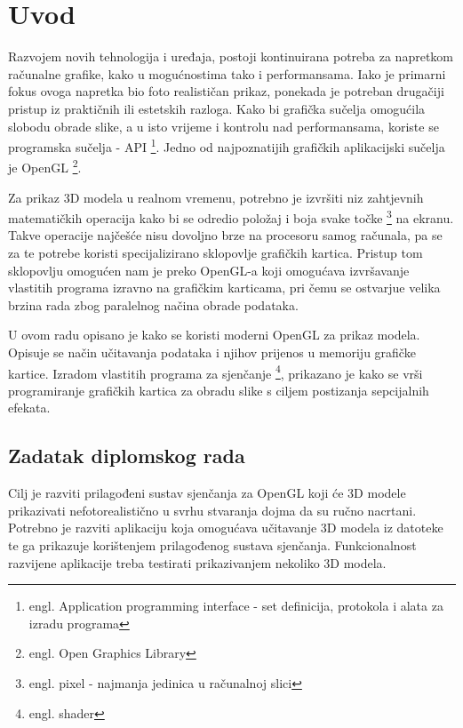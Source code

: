 \section{Uvod}

Razvojem novih tehnologija i uređaja, postoji kontinuirana potreba za napretkom računalne grafike, kako u mogućnostima tako i performansama. Iako je primarni fokus ovoga napretka bio foto realističan prikaz, ponekada je potreban drugačiji pristup iz praktičnih ili estetskih razloga. Kako bi grafička sučelja omogućila slobodu obrade slike, a u isto vrijeme i kontrolu nad performansama, koriste se programska sučelja - API \footnote{engl. Application programming interface - set definicija, protokola i alata za izradu programa}. Jedno od najpoznatijih grafičkih aplikacijski sučelja je OpenGL \footnote{engl. Open Graphics Library}.

Za prikaz 3D modela u realnom vremenu, potrebno je izvršiti niz zahtjevnih matematičkih operacija kako bi se odredio položaj i boja svake točke \footnote{engl. pixel - najmanja jedinica u računalnoj slici} na ekranu. Takve operacije najčešće nisu dovoljno brze na procesoru samog računala, pa se za te potrebe koristi specijalizirano sklopovlje grafičkih kartica. Pristup tom sklopovlju omogućen nam je preko OpenGL-a koji omogućava izvršavanje vlastitih programa izravno na grafičkim karticama, pri čemu se ostvarjue velika brzina rada zbog paralelnog načina obrade podataka.

U ovom radu opisano je kako se koristi moderni OpenGL za prikaz modela. Opisuje se način učitavanja podataka i njihov prijenos u memoriju grafičke kartice. Izradom vlastitih programa za sjenčanje \footnote{engl. shader}, prikazano je kako se vrši programiranje grafičkih kartica za obradu slike s ciljem postizanja sepcijalnih efekata.

\subsection{Zadatak diplomskog rada}

Cilj je razviti prilagođeni sustav sjenčanja za OpenGL koji će 3D modele prikazivati nefotorealistično u svrhu stvaranja dojma da su ručno nacrtani. Potrebno je razviti aplikaciju koja omogućava učitavanje  3D modela iz datoteke te ga prikazuje korištenjem prilagođenog sustava sjenčanja. Funkcionalnost razvijene aplikacije treba testirati prikazivanjem nekoliko 3D modela.
